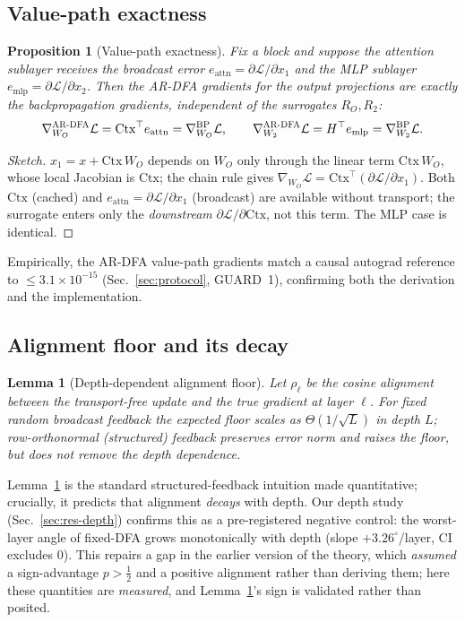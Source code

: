 \documentclass[11pt]{article}
\newtheorem{lemma}{Lemma}
\newtheorem{proposition}{Proposition}
\newcommand{\ARDFA}{\textsc{AR-DFA}}
\begin{document}
\subsection{Value-path exactness}
\begin{proposition}[Value-path exactness]\label{prop:vpe}
Fix a block and suppose the attention sublayer receives the broadcast error $e_{\text{attn}}=\partial\mathcal L/\partial x_1$ and the MLP sublayer $e_{\text{mlp}}=\partial\mathcal L/\partial x_2$. Then the \ARDFA{} gradients for the output projections are exactly the backpropagation gradients, independent of the surrogates $R_O,R_2$:
\begin{equation}
\nabla_{W_O}^{\ARDFA}\mathcal L = \mathrm{Ctx}^\top e_{\text{attn}} = \nabla_{W_O}^{\mathrm{BP}}\mathcal L,\qquad
\nabla_{W_2}^{\ARDFA}\mathcal L = H^\top e_{\text{mlp}} = \nabla_{W_2}^{\mathrm{BP}}\mathcal L .
\end{equation}
\end{proposition}
\begin{proof}[Sketch]
$x_1=x+\mathrm{Ctx}\,W_O$ depends on $W_O$ only through the linear term $\mathrm{Ctx}\,W_O$, whose local Jacobian is $\mathrm{Ctx}$; the chain rule gives $\nabla_{W_O}\mathcal L=\mathrm{Ctx}^\top(\partial\mathcal L/\partial x_1)$. Both $\mathrm{Ctx}$ (cached) and $e_{\text{attn}}=\partial\mathcal L/\partial x_1$ (broadcast) are available without transport; the surrogate enters only the \emph{downstream} $\partial\mathcal L/\partial\mathrm{Ctx}$, not this term. The MLP case is identical. \end{proof}
Empirically, the \ARDFA{} value-path gradients match a causal autograd reference to $\le 3.1\times 10^{-15}$ (Sec.~\ref{sec:protocol}, GUARD~1), confirming both the derivation and the implementation.

\subsection{Alignment floor and its decay}
\begin{lemma}[Depth-dependent alignment floor]\label{lem:floor}
Let $\rho_\ell$ be the cosine alignment between the transport-free update and the true gradient at layer $\ell$. For fixed random broadcast feedback the expected floor scales as $\Theta(1/\sqrt{L})$ in depth $L$; row-orthonormal (structured) feedback preserves error norm and raises the floor, but does not remove the depth dependence.
\end{lemma}
Lemma~\ref{lem:floor} is the standard structured-feedback intuition made quantitative; crucially, it predicts that alignment \emph{decays} with depth. Our depth study (Sec.~\ref{sec:res-depth}) confirms this as a pre-registered negative control: the worst-layer angle of fixed-DFA grows monotonically with depth (slope $+3.26^{\circ}$/layer, CI excludes $0$). This repairs a gap in the earlier version of the theory, which \emph{assumed} a sign-advantage $p>\tfrac12$ and a positive alignment rather than deriving them; here these quantities are \emph{measured}, and Lemma~\ref{lem:floor}'s sign is validated rather than posited.
\end{document}
